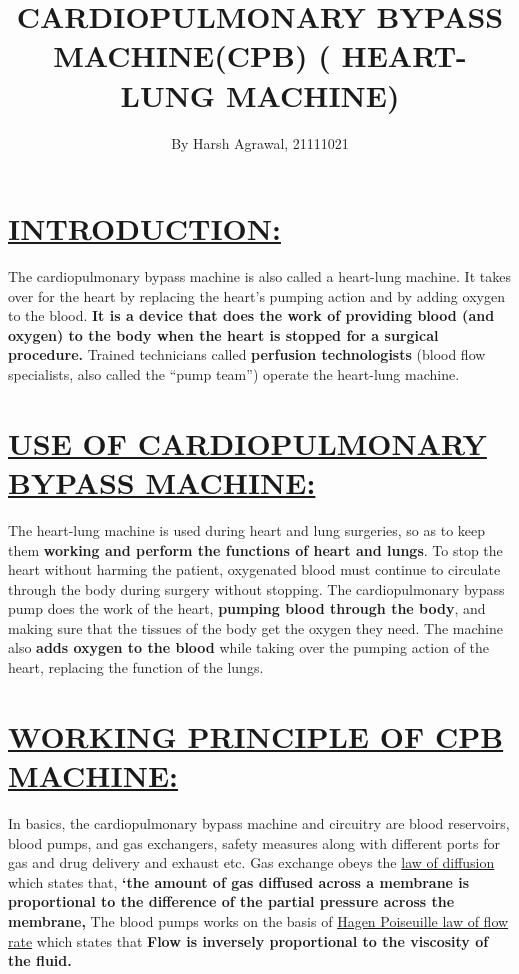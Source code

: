 \documentclass[12pt]{article}
\title{\textbf{CARDIOPULMONARY BYPASS MACHINE(CPB)
			( HEART-LUNG MACHINE)}}
\author{By Harsh Agrawal, 21111021}
\date{}
\begin{document}
\maketitle
{}

\raggedright{\section{\underline{INTRODUCTION:}}}
The cardiopulmonary bypass machine is also called a heart-lung machine. It takes over for the heart by replacing the heart’s pumping action and by adding oxygen to the blood. 
 \textbf{It is a device that does the work of providing blood (and oxygen) to the body when the heart is stopped for a surgical procedure.} Trained technicians called \textbf{perfusion technologists} (blood flow specialists, also called the “pump team”) operate the heart-lung machine.


\section{\underline{USE OF CARDIOPULMONARY BYPASS MACHINE:}}
The heart-lung machine is used during heart and lung surgeries, so as to keep them \textbf{working and perform the functions of heart and lungs}. To stop the heart without harming the patient, oxygenated blood must continue to circulate through the body during surgery without stopping. The cardiopulmonary bypass pump does the work of the heart, \textbf{pumping blood through the body}, and making sure that the tissues of the body get the oxygen they need.
 The machine also \textbf{adds oxygen to the blood} while taking over the pumping action of the heart, replacing the function of the lungs.

\section{\underline{WORKING PRINCIPLE OF CPB MACHINE:}}
In basics, the cardiopulmonary bypass machine and circuitry are blood reservoirs, blood pumps, and gas exchangers, safety measures along with different ports for gas and drug delivery and exhaust etc. Gas exchange obeys the \underline{law of diffusion} which states that, \textbf{‘the amount of gas diffused across a membrane is proportional to the difference of the partial pressure across the membrane,}
The blood  pumps  works  on  the  basis  of  \underline{Hagen Poiseuille law of flow rate} which states that \textbf{Flow is inversely proportional to the viscosity of the fluid.}
\end{document}
